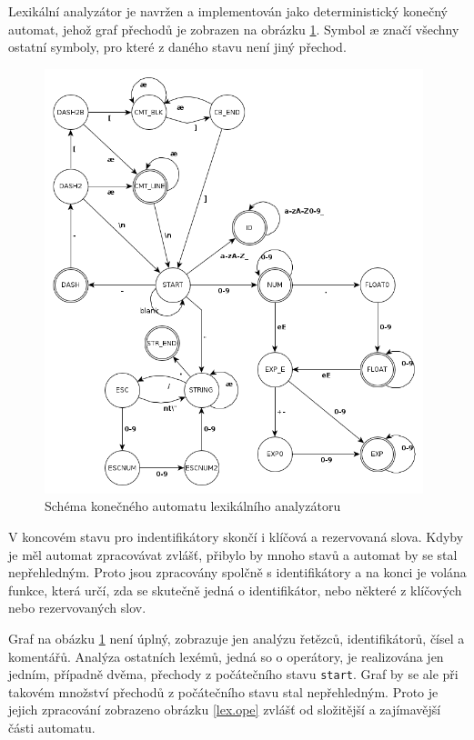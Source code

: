 Lexikální analyzátor je navržen a implementován jako deterministický ko\-neč\-ný automat, jehož graf přechodů je zobrazen na obrázku \ref{lex.lex}. Symbol \ae{} značí všechny ostatní symboly, pro které z daného stavu není jiný přechod.

\begin{figure}
\centering
\includegraphics[width=11cm]{lexical.png} %
\caption{Schéma konečného automatu lexikálního analyzátoru}
\label{lex.lex}
\end{figure}

V koncovém stavu pro indentifikátory skončí i klíčová a rezervovaná slova. Kdyby je měl automat zpracovávat zvlášť, přibylo by mnoho stavů a automat by se stal nepřehledným. Proto jsou zpracovány spolčně s identifikátory a na konci je volána funkce, která určí, zda se skutečně jedná o identifikátor, nebo některé z klíčových nebo rezervovaných slov.

Graf na obázku \ref{lex.lex} není úplný, zobrazuje jen analýzu řetězců, identifikátorů, čísel a komentářů. Analýza ostatních lexémů, jedná so o operátory, je realizována jen jedním, případně dvěma, přechody z počátečního stavu {\tt start}. Graf by se ale při takovém množství přechodů z počátečního stavu stal nepřehledným. Proto je jejich zpracování zobrazeno obrázku \ref{lex.ope} zvlášť od složitější a zajímavější části automatu.

